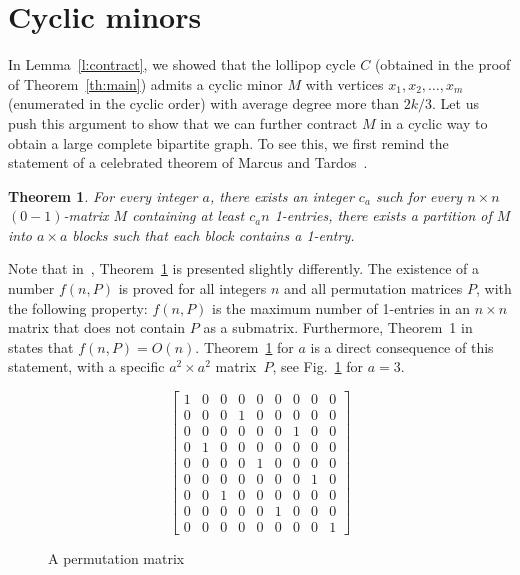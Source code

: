 \documentclass[11pt]{article}
\newtheorem{theo}{Theorem}[section]
\begin{document}
\section{Cyclic minors}
\label{sec:cyclic}

In Lemma~\ref{l:contract}, we showed that the lollipop cycle $C$  (obtained in the proof of Theorem~\ref{th:main}) admits a cyclic minor $M$ with vertices $x_1,x_2,\dots ,x_m$ (enumerated in the cyclic order) with average degree more than $2k/3$. Let us push this argument to show that we can further contract $M$ in a cyclic way to obtain a large complete bipartite graph. To see this, we first remind the statement of a celebrated theorem of Marcus and Tardos~\cite{MARCUS2004153}. 

\begin{theo}
\label{th:mt}
For every integer $a$, there exists an integer $c_a$ such for every $n\times n$ $(0-1)$-matrix $M$ containing at least $c_a n$ 1-entries, there exists a partition of $M$ into $a\times a$ blocks such that each block contains a 1-entry. 
\end{theo}

Note that in~\cite{MARCUS2004153}, Theorem~\ref{th:mt} is presented slightly differently. The existence of a number $f(n, P)$ is proved for all integers $n$ and all permutation matrices $P$, with the following property: $f(n, P)$ is the maximum number of 1-entries in an $n \times n$ matrix that does not contain $P$ as a submatrix.  Furthermore, Theorem~1 in ~\cite{MARCUS2004153} states that $f(n, P) = O(n)$.  Theorem~\ref{th:mt} for $a$ is a direct consequence of this statement, with a specific $a^2 \times a^2$ matrix~$P$, see Fig.~\ref{f:P} for $a=3$.

\begin{figure}
\[
\left[
\begin{array}{ccc|ccc|ccc}
1 & 0 & 0 & 0 & 0 & 0 & 0 & 0 & 0 \\
0 & 0 & 0 & 1 & 0 & 0 & 0 & 0 & 0 \\
0 & 0 & 0 & 0 & 0 & 0 & 1 & 0 & 0 \\
\hline
0 & 1 & 0 & 0 & 0 & 0 & 0 & 0 & 0 \\
0 & 0 & 0 & 0 & 1 & 0 & 0 & 0 & 0 \\
0 & 0 & 0 & 0 & 0 & 0 & 0 & 1 & 0 \\
\hline
0 & 0 & 1 & 0 & 0 & 0 & 0 & 0 & 0 \\
0 & 0 & 0 & 0 & 0 & 1 & 0 & 0 & 0 \\
0 & 0 & 0 & 0 & 0 & 0 & 0 & 0 & 1
\end{array}
\right]
\]
\caption{A permutation matrix}\label{f:P}
\end{figure}
\end{document}
